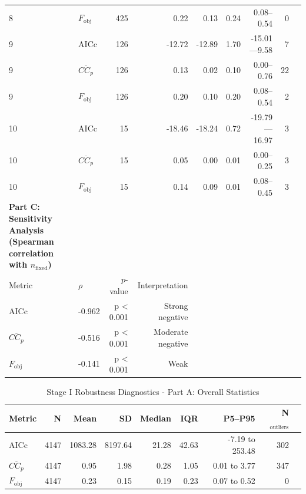 \documentclass{article}
\begin{document}
\begin{table}[h!]
\begin{tabular}{llrrrrrrr}
8 & $F_{\mathrm{obj}}$ & 425 & 0.22 & 0.13 & 0.24 & 0.08--0.54 & 0 \\
9 & AICc & 126 & -12.72 & -12.89 & 1.70 & -15.01---9.58 & 7 \\
9 & $\overline{CC_p}$ & 126 & 0.13 & 0.02 & 0.10 & 0.00--0.76 & 22 \\
9 & $F_{\mathrm{obj}}$ & 126 & 0.20 & 0.10 & 0.20 & 0.08--0.54 & 2 \\
10 & AICc & 15 & -18.46 & -18.24 & 0.72 & -19.79---16.97 & 3 \\
10 & $\overline{CC_p}$ & 15 & 0.05 & 0.00 & 0.01 & 0.00--0.25 & 3 \\
10 & $F_{\mathrm{obj}}$ & 15 & 0.14 & 0.09 & 0.01 & 0.08--0.45 & 3 \\
\hline
\textbf{Part C: Sensitivity Analysis (Spearman correlation with $n_{\mathrm{fixed}}$)} & & & & & & & & \\
\hline
Metric & $\rho$ & $p$-value & Interpretation & & & & \\
\hline
AICc & -0.962 & p < 0.001 & Strong negative & & & & \\
$\overline{CC_p}$ & -0.516 & p < 0.001 & Moderate negative & & & & \\
$F_{\mathrm{obj}}$ & -0.141 & p < 0.001 & Weak & & & & \\
\hline
\end{tabular}
\end{table}



\begin{table}[h!]
\centering
\caption{Stage I Robustness Diagnostics - Part A: Overall Statistics}
\label{tab:S1A}
\begin{tabular}{lrrrrrrrr}
\toprule
Metric & N & Mean & SD & Median & IQR & P5--P95 & N$_{\mathrm{outliers}}$ \\
\midrule
AICc & 4147 & 1083.28 & 8197.64 & 21.28 & 42.63 & -7.19 to 253.48 & 302 \\
$\overline{CC_p}$ & 4147 & 0.95 & 1.98 & 0.28 & 1.05 & 0.01 to 3.77 & 347 \\
$F_{\mathrm{obj}}$ & 4147 & 0.23 & 0.15 & 0.19 & 0.23 & 0.07 to 0.52 & 0 \\
\bottomrule
\end{tabular}
\end{table}
\end{document}
